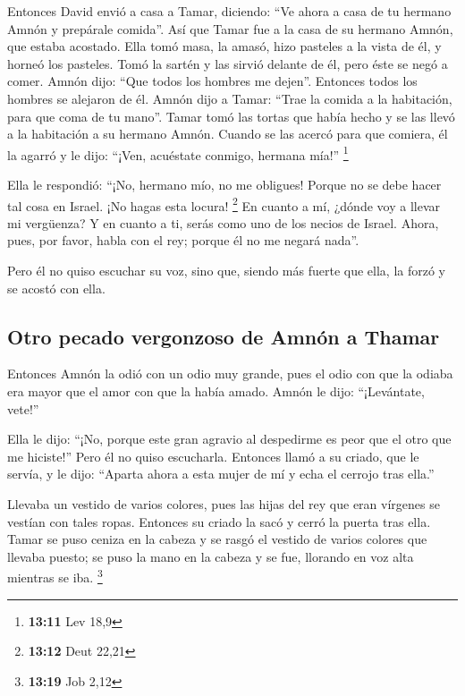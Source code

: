 \begin{paracol}{2}
 Entonces David envió a casa a Tamar, diciendo: ``Ve ahora
a casa de tu hermano Amnón y prepárale comida''.  Así que
Tamar fue a la casa de su hermano Amnón, que estaba acostado. Ella tomó
masa, la amasó, hizo pasteles a la vista de él, y horneó los pasteles.
 Tomó la sartén y las sirvió delante de él, pero éste se
negó a comer. Amnón dijo: ``Que todos los hombres me dejen''. Entonces
todos los hombres se alejaron de él.  Amnón dijo a Tamar:
``Trae la comida a la habitación, para que coma de tu mano''. Tamar tomó
las tortas que había hecho y se las llevó a la habitación a su hermano
Amnón.  Cuando se las acercó para que comiera, él la
agarró y le dijo: ``¡Ven, acuéstate conmigo, hermana mía!'' \footnote{\textbf{13:11}
  Lev 18,9}

 Ella le respondió: ``¡No, hermano mío, no me obligues!
Porque no se debe hacer tal cosa en Israel. ¡No hagas esta locura!
\footnote{\textbf{13:12} Deut 22,21}  En cuanto a mí,
¿dónde voy a llevar mi vergüenza? Y en cuanto a ti, serás como uno de
los necios de Israel. Ahora, pues, por favor, habla con el rey; porque
él no me negará nada''.

 Pero él no quiso escuchar su voz, sino que, siendo más
fuerte que ella, la forzó y se acostó con ella.

\hypertarget{otro-pecado-vergonzoso-de-amnuxf3n-a-thamar}{%
\subsection{Otro pecado vergonzoso de Amnón a
Thamar}\label{otro-pecado-vergonzoso-de-amnuxf3n-a-thamar}}

 Entonces Amnón la odió con un odio muy grande, pues el
odio con que la odiaba era mayor que el amor con que la había amado.
Amnón le dijo: ``¡Levántate, vete!''

 Ella le dijo: ``¡No, porque este gran agravio al
despedirme es peor que el otro que me hiciste!'' Pero él no quiso
escucharla.  Entonces llamó a su criado, que le servía, y
le dijo: ``Aparta ahora a esta mujer de mí y echa el cerrojo tras
ella.''

 Llevaba un vestido de varios colores, pues las hijas del
rey que eran vírgenes se vestían con tales ropas. Entonces su criado la
sacó y cerró la puerta tras ella.  Tamar se puso ceniza
en la cabeza y se rasgó el vestido de varios colores que llevaba puesto;
se puso la mano en la cabeza y se fue, llorando en voz alta mientras se
iba. \footnote{\textbf{13:19} Job 2,12}


\end{paracol}
